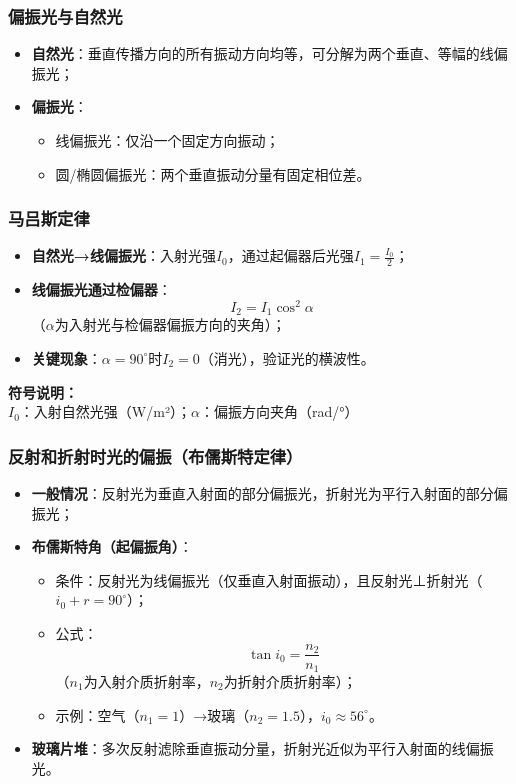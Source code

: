 \subsubsection{偏振光与自然光}
\begin{itemize}
    \item \textbf{自然光}：垂直传播方向的所有振动方向均等，可分解为两个垂直、等幅的线偏振光；
    \item \textbf{偏振光}：
          \begin{itemize}
              \item 线偏振光：仅沿一个固定方向振动；
              \item 圆/椭圆偏振光：两个垂直振动分量有固定相位差。
          \end{itemize}
\end{itemize}
\vspace{0.5em}

\subsubsection{马吕斯定律}
\begin{itemize}
    \item \textbf{自然光→线偏振光}：入射光强$I_0$，通过起偏器后光强$I_1 = \frac{I_0}{2}$；
    \item \textbf{线偏振光通过检偏器}：
          \[
          I_2 = I_1 \cos^2\alpha
          \]（$\alpha$为入射光与检偏器偏振方向的夹角）；
    \item \textbf{关键现象}：$\alpha=90^\circ$时$I_2=0$（消光），验证光的横波性。
\end{itemize}

\textbf{符号说明：} \\
$I_0$：入射自然光强（W/m²）；\quad $\alpha$：偏振方向夹角（rad/°）
\vspace{0.5em}

\subsubsection{反射和折射时光的偏振（布儒斯特定律）}
\begin{itemize}
    \item \textbf{一般情况}：反射光为垂直入射面的部分偏振光，折射光为平行入射面的部分偏振光；
    \item \textbf{布儒斯特角（起偏振角）}：
          \begin{itemize}
              \item 条件：反射光为线偏振光（仅垂直入射面振动），且反射光⊥折射光（$i_0 + r = 90^\circ$）；
              \item 公式：
                    \[
                    \tan i_0 = \frac{n_2}{n_1}
                    \]（$n_1$为入射介质折射率，$n_2$为折射介质折射率）；
              \item 示例：空气（$n_1=1$）→玻璃（$n_2=1.5$），$i_0 \approx 56^\circ$。
          \end{itemize}
    \item \textbf{玻璃片堆}：多次反射滤除垂直振动分量，折射光近似为平行入射面的线偏振光。
\end{itemize}
\vspace{0.5em}

